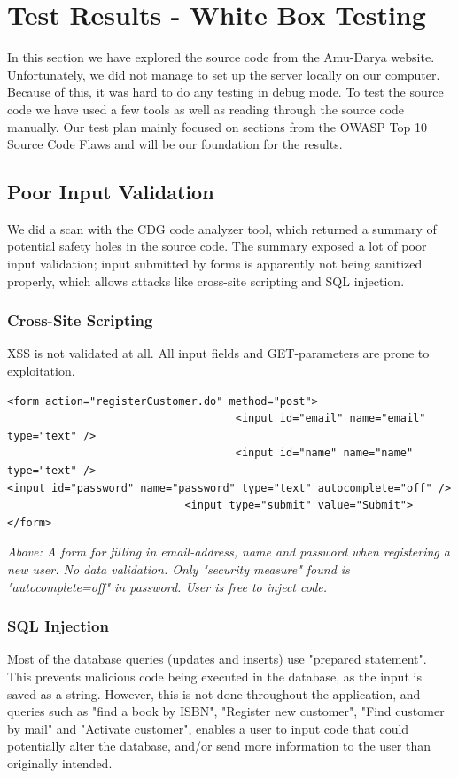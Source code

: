 \clearpage
\section{Test Results - White Box Testing}
In this section we have explored the source code from the Amu-Darya website. Unfortunately, we did not manage to set up the server locally on our computer. Because of this, it was hard to do any testing in debug mode. To test the source code we have used a few tools as well as reading through the source code manually. Our test plan mainly focused on sections from the OWASP Top 10 Source Code Flaws and will be our foundation for the results.

\subsection{Poor Input Validation}
We did a scan with the CDG code analyzer tool, which returned a summary of potential safety holes in the source code. The summary exposed a lot of poor input validation; input submitted by forms is apparently not being sanitized properly, which allows attacks like cross-site scripting and SQL injection.

\subsubsection{Cross-Site Scripting}
XSS is not validated at all. All input fields and GET-parameters are prone to exploitation.

\begin{lstlisting}
<form action="registerCustomer.do" method="post">
                                    <input id="email" name="email" type="text" />
                                	<input id="name" name="name" type="text" />
<input id="password" name="password" type="text" autocomplete="off" />
                        	<input type="submit" value="Submit">
</form>
\end{lstlisting}
{\em Above: A form for filling in email-address, name and password when registering a new user. No data validation. Only "security measure" found is "autocomplete=off" in password. User is free to inject code.}


\subsubsection{SQL Injection}
Most of the database queries (updates and inserts) use "prepared statement". This prevents malicious code being executed in the database, as the input is saved as a string. However, this is not done throughout the application, and queries such as "find a book by ISBN", "Register new customer", "Find customer by mail" and "Activate customer", enables a user to input code that could potentially alter the database, and/or send more information to the user than originally intended.

